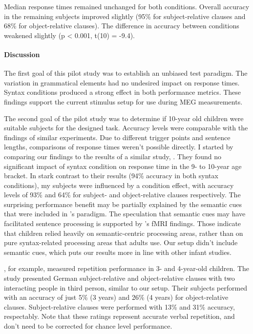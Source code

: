 Median response times remained unchanged for both conditions.
Overall accuracy in the remaining subjects improved slightly (95\% for subject-relative clauses and 68\% for object-relative clauses).
The difference in accuracy between conditions weakened slightly (p < 0.001, t(10) = -9.4).


\paragraph{Discussion}

The first goal of this pilot study was to establish an unbiased test paradigm.
The variation in grammatical elements had no undesired impact on response times.
Syntax conditions produced a strong effect in both performance metrics.
These findings support the current stimulus setup for use during MEG measurements.


The second goal of the pilot study was to determine if 10-year old children were suitable subjects for the designed task.
Accuracy levels were comparable with the findings of similar experiments.
Due to different trigger points and sentence lengths, comparisons of response times weren't possible directly.
I started by comparing our findings to the results of a similar study, \cite{2.1}.
They found no significant impact of syntax condition on response time in the 9- to 10-year age bracket.
In stark contrast to their results (94\% accuracy in both syntax conditions), my subjects were influenced by a condition effect, with accuracy levels of 93\% and 64\% for subject- and object-relative clauses respectively.
The surprising performance benefit may be partially explained by the semantic cues that were included in \cite{2.1}'s paradigm.
The speculation that semantic cues may have facilitated sentence processing is supported by \cite{2.1}'s fMRI findings.
Those indicate that children relied heavily on semantic-centric processing areas, rather than on pure syntax-related processing areas that adults use.
Our setup didn't include semantic cues, which puts our results more in line with other infant studies.

\cite{2.2}, for example, measured repetition performance in 3- and 4-year-old children.
The study presented German subject-relative and object-relative clauses with two interacting people in third person, similar to our setup.
Their subjects performed with an accuracy of just 5\% (3 years) and 26\% (4 years) for object-relative clauses.
Subject-relative clauses were performed with 13\% and 31\% accuracy, respectably.
Note that these ratings represent accurate verbal repetition, and don't need to be corrected for chance level performance.

